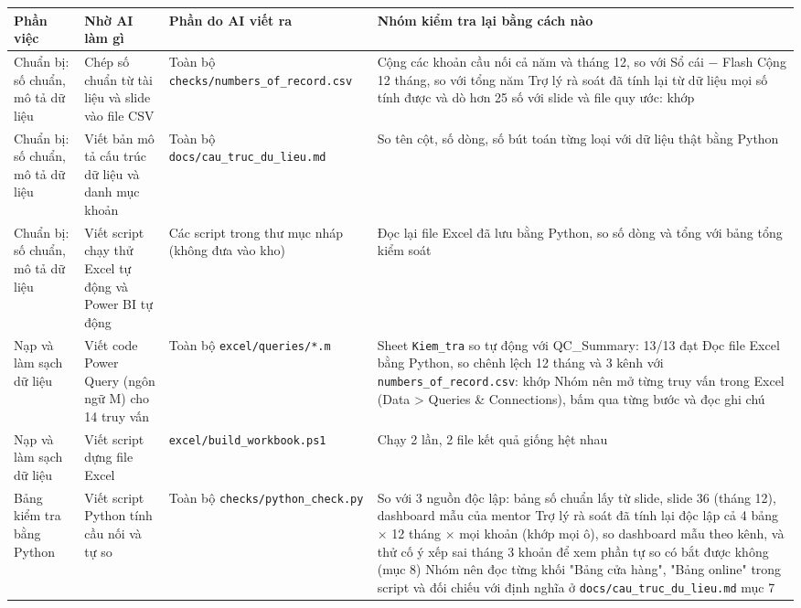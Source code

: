 {\scriptsize
\begin{longtable}{@{}L{2.1cm} L{3.6cm} L{4.2cm} L{5.2cm}@{}}
\toprule
Phần việc & Nhờ AI làm gì & Phần do AI viết ra & Nhóm kiểm tra lại bằng cách nào \\
\midrule
\endhead
Chuẩn bị: số chuẩn, mô tả dữ liệu & Chép số chuẩn từ tài liệu và slide vào file CSV & Toàn bộ \texttt{checks/\allowbreak{}numbers\_\allowbreak{}of\_\allowbreak{}record.\allowbreak{}csv} & \textbullet{} Cộng các khoản cầu nối cả năm và tháng 12, so với Sổ cái $-$ Flash \newline \textbullet{} Cộng 12 tháng, so với tổng năm \newline \textbullet{} Trợ lý rà soát đã tính lại từ dữ liệu mọi số tính được và dò hơn 25 số với slide và file quy ước: khớp \\
Chuẩn bị: số chuẩn, mô tả dữ liệu & Viết bản mô tả cấu trúc dữ liệu và danh mục khoản & Toàn bộ \texttt{docs/\allowbreak{}cau\_\allowbreak{}truc\_\allowbreak{}du\_\allowbreak{}lieu.\allowbreak{}md} & So tên cột, số dòng, số bút toán từng loại với dữ liệu thật bằng Python \\
Chuẩn bị: số chuẩn, mô tả dữ liệu & Viết script chạy thử Excel tự động và Power BI tự động & Các script trong thư mục nháp (không đưa vào kho) & Đọc lại file Excel đã lưu bằng Python, so số dòng và tổng với bảng tổng kiểm soát \\
Nạp và làm sạch dữ liệu & Viết code Power Query (ngôn ngữ M) cho 14 truy vấn & Toàn bộ \texttt{excel/\allowbreak{}queries/\allowbreak{}*.\allowbreak{}m} & \textbullet{} Sheet \texttt{Kiem\_\allowbreak{}tra} so tự động với QC\_Summary: 13/13 đạt \newline \textbullet{} Đọc file Excel bằng Python, so chênh lệch 12 tháng và 3 kênh với \texttt{numbers\_\allowbreak{}of\_\allowbreak{}record.\allowbreak{}csv}: khớp \newline \textbullet{} Nhóm nên mở từng truy vấn trong Excel (Data > Queries \& Connections), bấm qua từng bước và đọc ghi chú \\
Nạp và làm sạch dữ liệu & Viết script dựng file Excel & \texttt{excel/\allowbreak{}build\_\allowbreak{}workbook.\allowbreak{}ps1} & Chạy 2 lần, 2 file kết quả giống hệt nhau \\
Bảng kiểm tra bằng Python & Viết script Python tính cầu nối và tự so & Toàn bộ \texttt{checks/\allowbreak{}python\_\allowbreak{}check.\allowbreak{}py} & \textbullet{} So với 3 nguồn độc lập: bảng số chuẩn lấy từ slide, slide 36 (tháng 12), dashboard mẫu của mentor \newline \textbullet{} Trợ lý rà soát đã tính lại độc lập cả 4 bảng $\times$ 12 tháng $\times$ mọi khoản (khớp mọi ô), so dashboard mẫu theo kênh, và thử cố ý xếp sai tháng 3 khoản để xem phần tự so có bắt được không (mục 8) \newline \textbullet{} Nhóm nên đọc từng khối "Bảng cửa hàng", "Bảng online" trong script và đối chiếu với định nghĩa ở \texttt{docs/\allowbreak{}cau\_\allowbreak{}truc\_\allowbreak{}du\_\allowbreak{}lieu.\allowbreak{}md} mục 7 \\

\end{longtable}}
